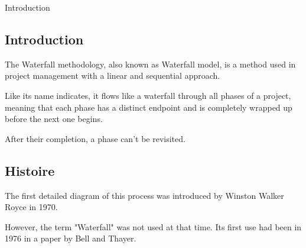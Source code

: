 \begin{frame}{Introduction}

   \subsection{Introduction}

   \item The Waterfall methodology, also known as Waterfall model, is a method used in project management with a linear and sequential approach.

   \item Like its name indicates, it flows like a waterfall through all phases of a project, meaning that each phase has a distinct endpoint and is completely wrapped up before the next one begins.

   \item After their completion, a phase can't be revisited.


   \subsection{Histoire}

   \item The first detailed diagram of this process was introduced by Winston Walker Royce in 1970.

   \item However, the term "Waterfall" was not used at that time. Its first use had been in 1976 in a paper by Bell and Thayer.



\end{frame}